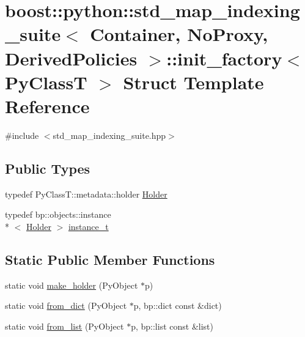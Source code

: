 \hypertarget{structboost_1_1python_1_1std__map__indexing__suite_1_1init__factory}{\section{boost\-:\-:python\-:\-:std\-\_\-map\-\_\-indexing\-\_\-suite$<$ Container, No\-Proxy, Derived\-Policies $>$\-:\-:init\-\_\-factory$<$ Py\-Class\-T $>$ Struct Template Reference}
\label{structboost_1_1python_1_1std__map__indexing__suite_1_1init__factory}
}


{\ttfamily \#include $<$std\-\_\-map\-\_\-indexing\-\_\-suite.\-hpp$>$}

\subsection*{Public Types}
\begin{DoxyCompactItemize}
\item 
typedef Py\-Class\-T\-::metadata\-::holder \hyperlink{structboost_1_1python_1_1std__map__indexing__suite_1_1init__factory_a785b4c017210dd048b47eb6c04a5cdc6}{Holder}
\item 
typedef bp\-::objects\-::instance\\*
$<$ \hyperlink{structboost_1_1python_1_1std__map__indexing__suite_1_1init__factory_a785b4c017210dd048b47eb6c04a5cdc6}{Holder} $>$ \hyperlink{structboost_1_1python_1_1std__map__indexing__suite_1_1init__factory_aea2971d45c2f4de6ac83494b504d9a19}{instance\-\_\-t}
\end{DoxyCompactItemize}
\subsection*{Static Public Member Functions}
\begin{DoxyCompactItemize}
\item 
static void \hyperlink{structboost_1_1python_1_1std__map__indexing__suite_1_1init__factory_acd1c1789efbbb4f595abae51b1f0a2a0}{make\-\_\-holder} (Py\-Object $\ast$p)
\item 
static void \hyperlink{structboost_1_1python_1_1std__map__indexing__suite_1_1init__factory_aa1f0944f15cb284c240d25bfa6f0ccca}{from\-\_\-dict} (Py\-Object $\ast$p, bp\-::dict const \&dict)
\item 
static void \hyperlink{structboost_1_1python_1_1std__map__indexing__suite_1_1init__factory_ad0dbf8e2c1b8fa7dd7ecf87415e7d3fb}{from\-\_\-list} (Py\-Object $\ast$p, bp\-::list const \&list)
\end{DoxyCompactItemize}


